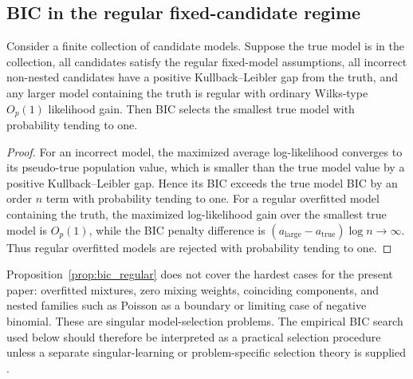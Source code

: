 \subsection{BIC in the regular fixed-candidate regime}

\begin{proposition}
\label{prop:bic_regular}
Consider a finite collection of candidate models.  Suppose the true model is in
the collection, all candidates satisfy the regular fixed-model assumptions, all
incorrect non-nested candidates have a positive Kullback--Leibler gap from the
truth, and any larger model containing the truth is regular with ordinary
Wilks-type \(O_p(1)\) likelihood gain.  Then BIC selects the smallest true model
with probability tending to one.
\end{proposition}

\begin{proof}
For an incorrect model, the maximized average log-likelihood converges to its
pseudo-true population value, which is smaller than the true model value by a
positive Kullback--Leibler gap.  Hence its BIC exceeds the true model BIC by an
order \(n\) term with probability tending to one.  For a regular overfitted
model containing the truth, the maximized log-likelihood gain over the smallest
true model is \(O_p(1)\), while the BIC penalty difference is
\((a_{\mathrm{large}}-a_{\mathrm{true}})\log n\to\infty\).  Thus regular
overfitted models are rejected with probability tending to one.
\end{proof}

\begin{remark}
Proposition~\ref{prop:bic_regular} does not cover the hardest cases for the
present paper: overfitted mixtures, zero mixing weights, coinciding components,
and nested families such as Poisson as a boundary or limiting case of negative
binomial.  These are singular model-selection problems.  The empirical BIC
search used below should therefore be interpreted as a practical selection
procedure unless a separate singular-learning or problem-specific selection
theory is supplied \citep{keribin2000order,drton2017sbic}.
\end{remark}
